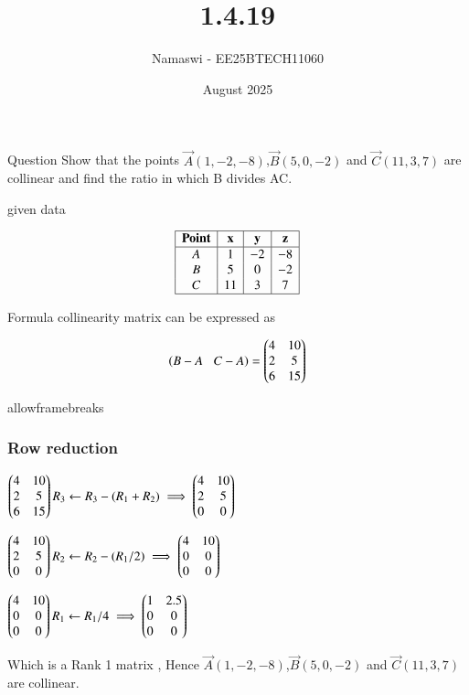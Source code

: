 \documentclass{beamer}
\title %
{1.4.19}
\date{August  2025}
\author %
{Namaswi - EE25BTECH11060}
\begin{document}
\frame{\titlepage}
\begin{frame}{Question}
 Show that the points $\vec{A}(1,-2,-8)$,$\vec{B}(5,0,-2)$ and $\vec{C}(11,3,7)$ are collinear and find the ratio in which B divides AC.
 
 

\end{frame}
 
\begin{frame}{given data}
 

\[
\begin{array}{|c|c|c|c|}
\hline
\textbf{Point} & \textbf{x} & \textbf{y} & \textbf{z} \\
\hline
A & 1 & -2 & -8 \\
B & 5 & 0 & -2 \\
C & 11 & 3 & 7 \\
\hline
\end{array}
\]

   
\end{frame}

\begin{frame}{Formula}
  collinearity matrix can be expressed as 

\begin{align*}
  \brak{B-A\;\;\;C-A} =\begin{myvec}{4  & 10\\2 & 5\\6  & 15}\end{myvec}
 \end{align*}
\end{frame}
 


 \begin{frame}{allowframebreaks}
\frametitle{Row reduction}

$\begin{pmatrix} 4 & 10 \\ 2 & 5 \\ 6 & 15 \end{pmatrix}
R_3 \leftarrow R_3 - (R_1 + R_2) \implies \begin{pmatrix} 4 & 10 \\ 2 & 5 \\ 0 & 0 \end{pmatrix}$

$\begin{pmatrix} 4 & 10 \\ 2 & 5 \\ 0 & 0 \end{pmatrix}
R_2 \leftarrow R_2 - (R_1/2)  \implies \begin{pmatrix}4&10 \\ 0 &0 \\0 & 0\end{pmatrix}$
  
$\begin{pmatrix}4&10 \\ 0 &0 \\0 & 0\end{pmatrix}
 R_1 \leftarrow R_1/4 \implies \begin{pmatrix}1 & 2.5 \\ 0 & 0 \\ 0 & 0\end{pmatrix}$
 


Which is a Rank 1 matrix , Hence   $\vec{A}(1,-2,-8)$,$\vec{B}(5,0,-2)$ and $\vec{C}(11,3,7)$ are collinear.
\end{frame}
\end{document}
